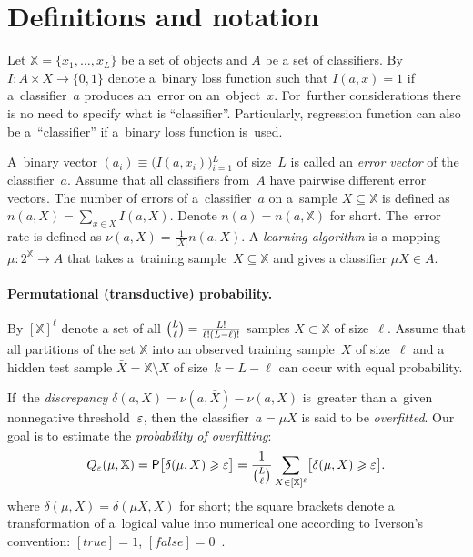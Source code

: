 \documentclass{article}
\let\cite\citep
\def\XX{\mathbb{X}}
\newcommand{\XXell}{[\XX]^\ell}
\newcommand{\X}{\bar X}
\renewcommand{\geq}{\geqslant}
\def\CC_#1^#2{\tbinom{#1}{#2}}
\providecommand{\Prob}{\mathsf{P}}
\renewcommand{\emph}[1]{\textit{#1}}
\begin{document}
\section{Definitions and notation}
\label{sec:Defs}

Let $\XX=\{x_1,\ldots,x_L\}$  be a set of objects and
$A$ be a set of classifiers.
By~$I\colon A\times X \to \{0,1\}$ denote a~binary loss function such that
$I(a,x)=1$ if a~classifier~$a$ produces an~error on an~object~$x$.
For~further considerations there is no need to specify what is ``classifier''.
Particularly, regression function can also be a~``classifier''
if a~binary loss function is~used.

\medskip
A~binary vector $(a_i)\equiv\bigl(I(a,x_i)\bigr){}_{i=1}^L$
of size~$L$ is called an \emph{error vector} of the classifier~$a$.
Assume that all classifiers from~$A$ have pairwise different error vectors.
The number of errors of a~classifier~$a$ on a~sample $X\subseteq\XX$
is defined as $n(a,X) = \sum_{x\in X} I(a,X)$.
Denote $n(a)=n(a,\XX)$ for short.
The~error rate is defined as
$\nu(a,X) = \frac1{|X|} n(a,X)$.
A \emph{learning algorithm} is a mapping ${\mu\colon 2^\XX \to A}$
that takes a~training sample~$X\subseteq\XX$  and gives a classifier ${\mu X \in A}$.

\paragraph{Permutational (transductive) probability.}
By $\XXell$ denote a set of all
$\CC_L^\ell = \tfrac{L!}{\ell!(L-\ell)!}$
samples $X\subset\XX$ of size~$\ell$.
Assume that all partitions of the set $\XX$ into
an observed training sample~$X$ of size~$\ell$
and a hidden test sample $\X=\XX\setminus X$ of size~$k=L-\ell$
can occur with equal probability.

If~the \emph{discrepancy}
$\delta(a, X) = \nu(a,\X) - \nu(a, X)$
is~greater than a~given nonnegative threshold~$\varepsilon$,
then the classifier~$a=\mu X$ is said to be \emph{overfitted}.
Our goal is to estimate the \emph{probability of overfitting}:
\[
    Q_\eps (\mu, \XX)
    =
    \Prob\bigl[
        \delta(\mu, X) \geq \eps
    \bigr]
    =
    \frac 1{\CC_L^\ell} \sum_{X\in\XXell}
    \bigl[
        \delta(\mu,X) \geq \eps
    \bigr].
\]
where
$\delta(\mu, X) = \delta(\mu X, X)$ for short;
the square brackets denote a transformation of a~logical value into numerical  one
according to Iverson's convention:
$[\textit{true}]=1$, $[\textit{false}]=0$~\cite{knuth98concrete-eng}.
\end{document}
